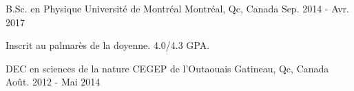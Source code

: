 \begin{cventries}
  \cventry
    {B.Sc. en Physique}
    {Universit\'e de Montr\'eal}
    {Montr\'eal, Qc, Canada}
    {Sep. 2014 - Avr. 2017}
    {
      \begin{cvitems}
        \item {Inscrit au palmar\`es de la doyenne. 4.0/4.3 GPA.}
      \end{cvitems}
    }
  \cventry
    {DEC en sciences de la nature}
    {CEGEP de l'Outaouais}
    {Gatineau, Qc, Canada}
    {Ao\^ut. 2012 - Mai 2014}
    {}
\end{cventries}
